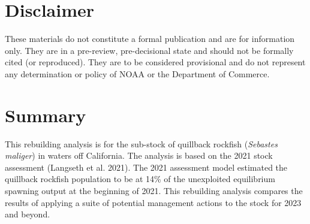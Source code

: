 \documentclass[11pt,
  english,
  a4paper,
]{article}
\begin{document}
\newcommand{\lt}{\ensuremath <}
\newcommand{\gt}{\ensuremath >}


\pagebreak
{}
\setcounter{page}{1}

\renewcommand{\thetable}{\roman{table}}
\renewcommand{\thefigure}{\roman{figure}}

\setlength\parskip{0.5em plus 0.1em minus 0.2em}


\hypertarget{disclaimer}{%
\section*{Disclaimer}\label{disclaimer}}

\leavevmode\tagmcend\tagstructend


These materials do not constitute a formal publication and are for information only. They are in a pre-review, pre-decisional state and should not be formally cited (or reproduced). They are to be considered provisional and do not represent any determination or policy of NOAA or the Department of Commerce.

\leavevmode\tagmcend\tagstructend\par


\hypertarget{summary}{%
\section*{Summary}\label{summary}}

\leavevmode\tagmcend\tagstructend


This rebuilding analysis is for the sub-stock of quillback rockfish (\emph{Sebastes maliger}) in waters off California. The analysis is based on the 2021 stock assessment {(Langseth et al. 2021)\leavevmode\tagmcend\tagstructend}. The 2021 assessment model estimated the quillback rockfish population to be at 14\% of the unexploited equilibrium spawning output at the beginning of 2021. This rebuilding analysis compares the results of applying a suite of potential management actions to the stock for 2023 and beyond.
\end{document}
